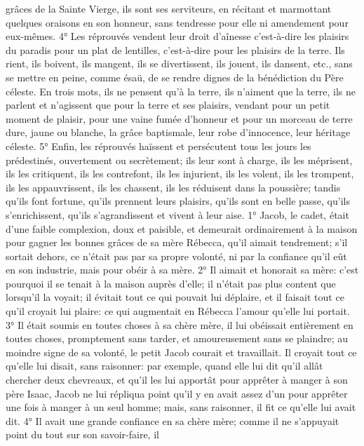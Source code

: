 grâces de la Sainte Vierge, ils sont ses serviteurs, en récitant et marmottant quelques oraisons en son honneur,
sans tendresse pour elle ni amendement pour eux-mêmes.
 4° Les réprouvés vendent leur droit d'aînesse c'est-à-dire les plaisirs du paradis pour un plat de lentilles,
c'est-à-dire pour les plaisirs de la terre. Ils rient, ils boivent, ils mangent, ils se divertissent, ils jouent, ils dansent,
etc., sans se mettre en peine, comme ésaü, de se rendre dignes de la bénédiction du Père céleste. En trois mots,
ils ne pensent qu'à la terre, ils n'aiment que la terre, ils ne parlent et n'agissent que pour la terre et ses plaisirs,
vendant pour un petit moment de plaisir, pour une vaine fumée d'honneur et pour un morceau de terre dure, jaune
ou blanche, la grâce baptismale, leur robe d'innocence, leur héritage céleste.
 5° Enfin, les réprouvés haïssent et persécutent tous les jours les prédestinés, ouvertement ou secrètement;
ils leur sont à charge, ils les méprisent, ils les critiquent, ils les contrefont, ils les injurient, ils les volent, ils les
trompent, ils les appauvrissent, ils les chassent, ils les réduisent dans la poussière; tandis qu'ils font fortune, qu'ils
prennent leurs plaisirs, qu'ils sont en belle passe, qu'ils s'enrichissent, qu'ils s'agrandissent et vivent à leur aise.
 1° Jacob, le cadet, était d'une faible complexion, doux et paisible, et demeurait ordinairement à la maison
pour gagner les bonnes grâces de sa mère Rébecca, qu'il aimait tendrement; s'il sortait dehors, ce n'était pas par
sa propre volonté, ni par la confiance qu'il eût en son industrie, mais pour obéir à sa mère.
 2° Il aimait et honorait sa mère: c'est pourquoi il se tenait à la maison auprès d'elle; il n'était pas plus content
que lorsqu'il la voyait; il évitait tout ce qui pouvait lui déplaire, et il faisait tout ce qu'il croyait lui plaire: ce qui
augmentait en Rébecca l'amour qu'elle lui portait.
 3° Il était soumis en toutes choses à sa chère mère, il lui obéissait entièrement en toutes choses,
promptement sans tarder, et amoureusement sans se plaindre; au moindre signe de sa volonté, le petit Jacob
courait et travaillait. Il croyait tout ce qu'elle lui disait, sans raisonner: par exemple, quand elle lui dit qu'il allât
chercher deux chevreaux, et qu'il les lui apportât pour apprêter à manger à son père Isaac, Jacob ne lui répliqua
point qu'il y en avait assez d'un pour apprêter une fois à manger à un seul homme; mais, sans raisonner, il fit ce
qu'elle lui avait dit.
 4° Il avait une grande confiance en sa chère mère; comme il ne s'appuyait point du tout sur son savoir-faire, il
